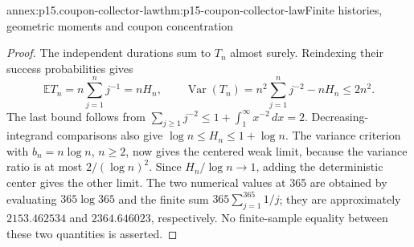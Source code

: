 \begin{annexitem}{annex:p15.coupon-collector-law}{thm:p15-coupon-collector-law}{Finite histories, geometric moments and coupon concentration}
\begin{proof}
The independent durations sum to \(T_n\) almost surely. Reindexing
their success probabilities gives
\[
 \mathbb ET_n=n\sum_{j=1}^n j^{-1}=nH_n,\qquad
 \operatorname{Var}(T_n)
  =n^2\sum_{j=1}^n j^{-2}-nH_n\leq2n^2.
\]
The last bound follows from
\(\sum_{j\geq1}j^{-2}\leq1+\int_1^\infty x^{-2}\,dx=2\).
Decreasing-integrand comparisons also give
\(\log n\leq H_n\leq1+\log n\).
The variance criterion with \(b_n=n\log n\), \(n\geq2\),
now gives the centered weak limit, because the variance ratio
is at most \(2/(\log n)^2\). Since \(H_n/\log n\to1\),
adding the deterministic center gives the other limit.
The two numerical values at 365 are obtained by evaluating
\(365\log365\) and the finite sum \(365\sum_{j=1}^{365}1/j\);
they are approximately \(2153.462534\) and \(2364.646023\),
respectively. No finite-sample equality between these two quantities
is asserted.
\end{proof}
\end{annexitem}

